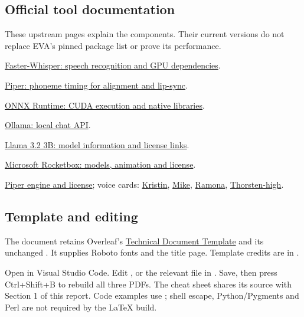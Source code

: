 \subsection{Official tool documentation}
These upstream pages explain the components. Their current versions do not replace
EVA's pinned package list or prove its performance.
\begin{description}[leftmargin=10mm,labelwidth=8mm,itemsep=3pt]
\item[U1] \href{https://github.com/SYSTRAN/faster-whisper}{Faster-Whisper: speech recognition and GPU dependencies}.
\item[U2] \href{https://github.com/OHF-Voice/piper1-gpl/blob/main/docs/ALIGNMENTS.md}{Piper: phoneme timing for alignment and lip-sync}.
\item[U3] \href{https://onnxruntime.ai/docs/execution-providers/CUDA-ExecutionProvider.html}{ONNX Runtime: CUDA execution and native libraries}.
\item[U4] \href{https://docs.ollama.com/api/chat}{Ollama: local chat API}.
\item[U5] \href{https://ollama.com/library/llama3.2:3b}{Llama 3.2 3B: model information and license links}.
\item[U6] \href{https://github.com/microsoft/Microsoft-Rocketbox}{Microsoft Rocketbox: models, animation and license}.
\item[U7] \href{https://github.com/OHF-Voice/piper1-gpl}{Piper engine and license}; voice cards:
\href{https://huggingface.co/rhasspy/piper-voices/blob/main/en/en_US/kristin/medium/MODEL_CARD}{Kristin},
\href{https://huggingface.co/rhasspy/piper-voices/blob/main/en/en_US/mike/medium/MODEL_CARD}{Mike},
\href{https://huggingface.co/rhasspy/piper-voices/blob/main/de/de_DE/ramona/low/MODEL_CARD}{Ramona},
\href{https://huggingface.co/rhasspy/piper-voices/blob/main/de/de_DE/thorsten/high/MODEL_CARD}{Thorsten-high}.
\end{description}

\subsection{Template and editing}
The document retains Overleaf's
\href{https://www.overleaf.com/latex/templates/technical-document-template/mdgftpdfbvbs}{Technical Document Template}
and its unchanged . It supplies Roboto fonts and
the title page. Template credits are in .

Open  in Visual Studio Code. Edit ,
 or the relevant file in . Save, then press
Ctrl+Shift+B to rebuild all three PDFs. The cheat sheet shares its source with
Section 1 of this report. Code examples use ; shell escape,
Python/Pygments and Perl are not required by the LaTeX build.
\endgroup

